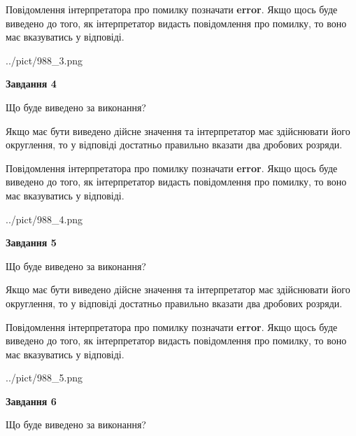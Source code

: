 \documentclass[12pt, ukrainian]{article}
\begin{document}
{\begin {Large}
Повідомлення інтерпретатора про помилку позначати \textbf{error}.
Якщо щось буде виведено до того, як інтерпретатор видасть повідомлення про помилку, 
то воно має вказуватись у відповіді. \par

\begin{center}
	{../pict/988_3.png}
\end{center}
\newpage

{\begin {center}\textbf{Завдання 4}\end {center}}\par
Що буде виведено за виконання? \par

Якщо має бути виведено дійсне значення та інтерпретатор має здійснювати його округлення, 
то у відповіді достатньо правильно вказати два дробових розряди.

Повідомлення інтерпретатора про помилку позначати \textbf{error}.
Якщо щось буде виведено до того, як інтерпретатор видасть повідомлення про помилку, 
то воно має вказуватись у відповіді. \par

\begin{center}
	{../pict/988_4.png}
\end{center}
\newpage

{\begin {center}\textbf{Завдання 5}\end {center}}\par
Що буде виведено за виконання? \par

Якщо має бути виведено дійсне значення та інтерпретатор має здійснювати його округлення, 
то у відповіді достатньо правильно вказати два дробових розряди.

Повідомлення інтерпретатора про помилку позначати \textbf{error}.
Якщо щось буде виведено до того, як інтерпретатор видасть повідомлення про помилку, 
то воно має вказуватись у відповіді. \par

\begin{center}
	{../pict/988_5.png}
\end{center}
\newpage

{\begin {center}\textbf{Завдання 6}\end {center}}\par
Що буде виведено за виконання? \par


\end{Large}}
\end{document}
